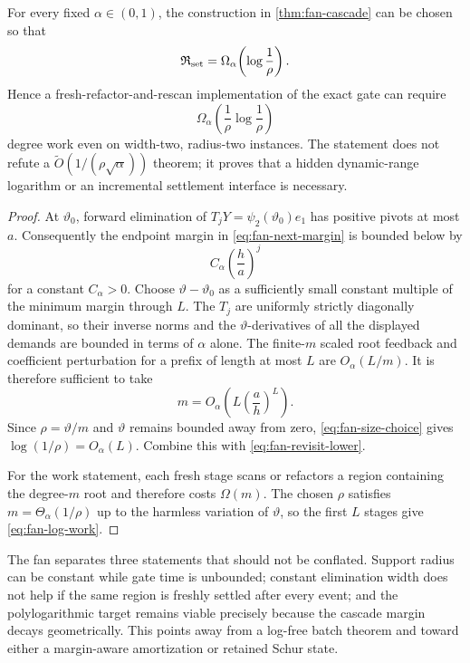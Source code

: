 \begin{corollary}
\label{cor:fan-logarithmic-loss}
For every fixed $\alpha\in(0,1)$, the construction in
\cref{thm:fan-cascade} can be chosen so that
\begin{equation}
 \mathfrak R_{\rm set}
 =\Omega_\alpha\!\left(\log\frac1\rho\right).
 \label{eq:fan-log-revisit}
\end{equation}
Hence a fresh-refactor-and-rescan implementation of the exact gate can require
\begin{equation}
 \Omega_\alpha\!\left(
  \frac1\rho\log\frac1\rho
 \right)
 \label{eq:fan-log-work}
\end{equation}
degree work even on width-two, radius-two instances.  The statement does not
refute a $\widetilde O(1/(\rho\sqrt\alpha))$ theorem; it proves that a hidden
dynamic-range logarithm or an incremental settlement interface is necessary.
\end{corollary}

\begin{proof}
At $\vartheta_0$, forward elimination of
$T_jY=\psi_2(\vartheta_0)e_1$ has positive pivots at most $a$.
Consequently the endpoint margin in
\cref{eq:fan-next-margin} is bounded below by
\begin{equation}
 C_\alpha\left(\frac h a\right)^j
 \label{eq:fan-margin-decay}
\end{equation}
for a constant $C_\alpha>0$.  Choose
$\vartheta-\vartheta_0$ as a sufficiently small constant multiple of the
minimum margin through $L$.  The $T_j$ are uniformly strictly diagonally
dominant, so their inverse norms and the $\vartheta$-derivatives of all the
displayed demands are bounded in terms of $\alpha$ alone.  The finite-$m$
scaled root feedback and coefficient perturbation for a prefix of length at
most $L$ are $O_\alpha(L/m)$.  It is therefore sufficient to take
\begin{equation}
 m=O_\alpha\!\left(
  L\left(\frac a h\right)^L
 \right).
 \label{eq:fan-size-choice}
\end{equation}
Since $\rho=\vartheta/m$ and $\vartheta$ remains bounded away from zero,
\cref{eq:fan-size-choice} gives
$\log(1/\rho)=O_\alpha(L)$.  Combine this with
\cref{eq:fan-revisit-lower}.

For the work statement, each fresh stage scans or refactors a region
containing the degree-$m$ root and therefore costs $\Omega(m)$.  The chosen
$\rho$ satisfies $m=\Theta_\alpha(1/\rho)$ up to the harmless variation of
$\vartheta$, so the first $L$ stages give \cref{eq:fan-log-work}.
\end{proof}

The fan separates three statements that should not be conflated.  Support
radius can be constant while gate time is unbounded; constant elimination
width does not help if the same region is freshly settled after every event;
and the polylogarithmic target remains viable precisely because the cascade
margin decays geometrically.  This points away from a log-free batch theorem
and toward either a margin-aware amortization or retained Schur state.
